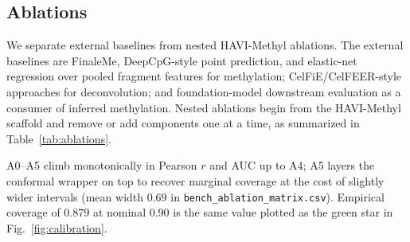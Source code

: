 \subsection{Ablations}
We separate external baselines from nested HAVI-Methyl ablations. The external baselines are FinaleMe, DeepCpG-style point prediction, and elastic-net regression over pooled fragment features for methylation; CelFiE/CelFEER-style approaches for deconvolution; and foundation-model downstream evaluation as a consumer of inferred methylation. Nested ablations begin from the HAVI-Methyl scaffold and remove or add components one at a time, as summarized in Table~\ref{tab:ablations}.

\begin{table}[htbp]
\centering\small
\caption{Nested HAVI-Methyl ablation matrix. Measured Pearson $r$ and AUC are from \texttt{bench\_ablation\_matrix.csv} on the synthetic FinaleMe-proxy ($S=12$, $L=120$, coverage $2\times$, seed $20260429$). A5 row reports the post-conformal empirical coverage at nominal $0.90$ in \texttt{coverage\_90}.}
\label{tab:ablations}
\end{table}

A0--A5 climb monotonically in Pearson $r$ and AUC up to A4; A5 layers the conformal wrapper on top to recover marginal coverage at the cost of slightly wider intervals (mean width $0.69$ in \texttt{bench\_ablation\_matrix.csv}). Empirical coverage of $0.879$ at nominal $0.90$ is the same value plotted as the green star in Fig.~\ref{fig:calibration}.

